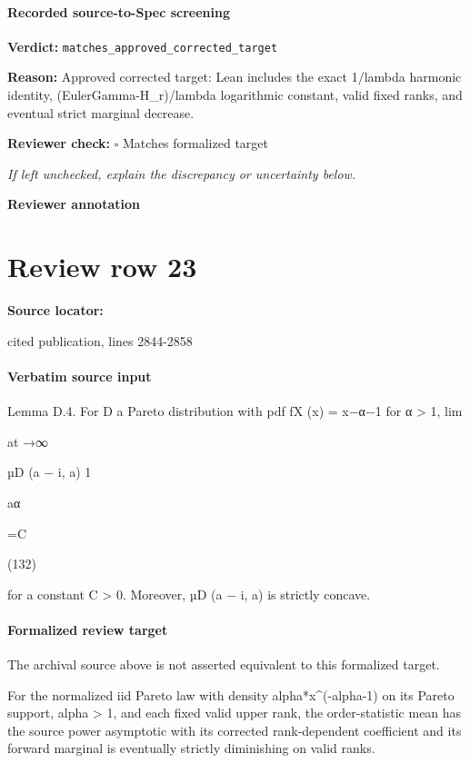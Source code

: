 \documentclass[10pt]{article}
\newcommand{\reviewerbox}{%
  \par\noindent\fbox{\parbox{0.96\linewidth}{\rule{0pt}{0.38in}}}\par
}
\newcommand{\reviewmatch}[1]{%
  \par\noindent\textbf{Reviewer check:} $\square$\; #1\par
  \noindent\emph{If left unchecked, explain the discrepancy or uncertainty below.}\par
}
\begin{document}
\paragraph{Recorded source-to-Spec screening}
\textbf{Verdict:} \texttt{matches\_approved\_corrected\_target}
\\
{\raggedright
\textbf{Reason:} Approved corrected target:\allowbreak{} Lean includes the exact 1/\allowbreak{}lambda harmonic identity, (EulerGamma-\allowbreak{}H\_\allowbreak{}r)/\allowbreak{}lambda logarithmic constant, valid fixed ranks, and eventual strict marginal decrease.\allowbreak{}
\par}
\reviewmatch{Matches formalized target}
\noindent\textbf{Reviewer annotation}\par
\reviewerbox
\clearpage
\hypertarget{source-claim-49105a2b2538ba9d}{}
\section*{Review row 23}
\textbf{Source locator:} {\footnotesize\raggedright cited publication, lines 2844-\allowbreak{}2858\par}
\paragraph{Verbatim source input}
\begin{ReviewVerbatim}
Lemma D.4. For D a Pareto distribution with pdf fX (x) = x−α−1 for α > 1,
lim

at →∞

µD (a − i, a)
1

aα

=C

(132)

for a constant C > 0. Moreover, µD (a − i, a) is strictly concave.
\end{ReviewVerbatim}


\paragraph{Formalized review target}
The archival source above is not asserted equivalent to this formalized target.
\begin{ReviewVerbatim}
For the normalized iid Pareto law with density alpha*x^(-alpha-1) on its Pareto support, alpha > 1, and each fixed valid upper rank, the order-statistic mean has the source power asymptotic with its corrected rank-dependent coefficient and its forward marginal is eventually strictly diminishing on valid ranks.
\end{ReviewVerbatim}
\end{document}
